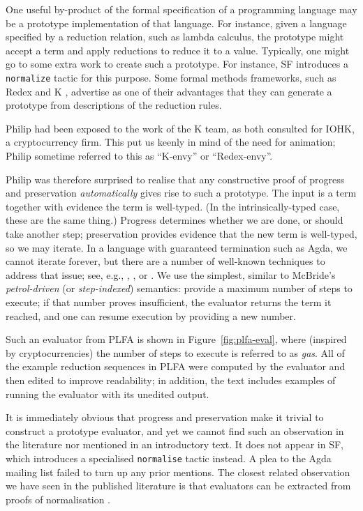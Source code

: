\documentclass[preprint,authoryear]{elsarticle}
\begin{document}
One useful by-product of the formal specification of a programming
language may be a prototype implementation of that language.  For
instance, given a language specified by a reduction relation, such
as lambda calculus, the prototype might accept a term and apply reductions
to reduce it to a value.  Typically, one might go to some extra work to
create such a prototype.  For instance, SF introduces a \texttt{normalize}
tactic for this purpose.  Some formal methods frameworks, such as
Redex \citep{Felleisen-et-al-2009} and K \citep{Rosu-Serbanuta-2010},
advertise as one of their advantages that they can generate
a prototype from descriptions of the reduction rules.

Philip had been exposed to the work of the K team, as both consulted
for IOHK, a cryptocurrency firm.  This put us keenly in mind of the
need for animation; Philip sometime referred to this as ``K-envy'' or
``Redex-envy''.

Philip was therefore surprised to realise that any constructive proof of
progress and preservation \emph{automatically} gives rise to such a
prototype.  The input is a term together with evidence the term is
well-typed.  (In the intrinsically-typed case, these are the same thing.)
Progress determines whether we are done, or should take another step;
preservation provides evidence that the new term is well-typed, so we
may iterate. In a language with guaranteed termination such as Agda, we cannot
iterate forever, but there are a number of well-known techniques to
address that issue; see, e.g., \citet{Bove-and-Capretta-2001},
\citet{Capretta-2005}, or \citet{McBride-2015}.
We use the simplest, similar to McBride's \emph{petrol-driven} (or
\emph{step-indexed}) semantics: provide a maximum number of steps to
execute; if that number proves insufficient, the evaluator returns the
term it reached, and one can resume execution by providing a new
number.

Such an evaluator from PLFA is shown in Figure~\ref{fig:plfa-eval},
where (inspired by cryptocurrencies) the number of steps
to execute is referred to as \emph{gas}. All of the example reduction
sequences in PLFA were computed by the evaluator and then edited to
improve readability; in addition, the text includes examples of
running the evaluator with its unedited output.

It is immediately obvious that progress and preservation make it
trivial to construct a prototype evaluator, and yet we cannot find such
an observation in the literature nor mentioned in an introductory
text.  It does not appear in SF, which introduces a specialised
\texttt{normalise} tactic instead.  A plea
to the Agda mailing list failed to turn up any prior mentions.
The closest related observation we have seen in the published
literature is that evaluators can be extracted from proofs of
normalisation \citep{Berger-1993,Dagand-and-Scherer-2015}.
\end{document}
